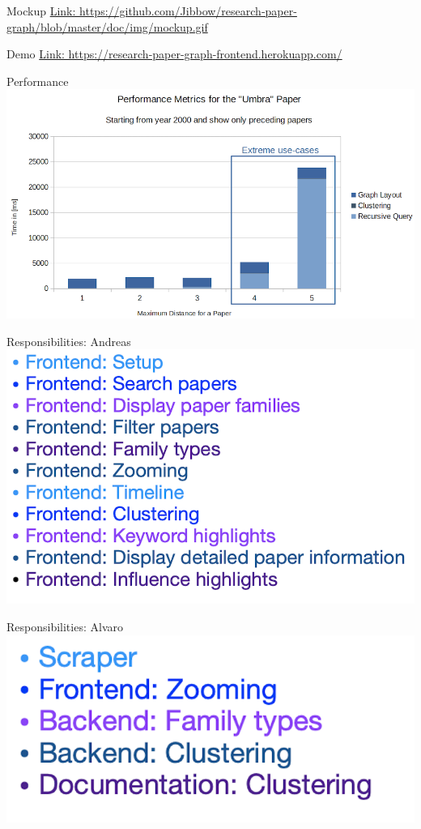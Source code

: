 \documentclass{beamer}
\begin{document}
\begin{frame}{Mockup}
    \url{Link: https://github.com/Jibbow/research-paper-graph/blob/master/doc/img/mockup.gif}
\end{frame}

\begin{frame}{Demo}
    \url{Link: https://research-paper-graph-frontend.herokuapp.com/}
\end{frame}

\begin{frame}{Performance}
    \includegraphics{img_25.png}
\end{frame}

\begin{frame}{Responsibilities: Andreas}
    \includegraphics{img_22.png}
\end{frame}

\begin{frame}{Responsibilities: Alvaro}
    \includegraphics{img_23.png}
\end{frame}
\end{document}
